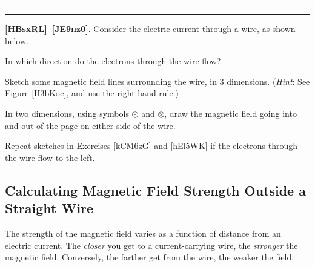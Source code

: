 \documentclass{article}
\begin{document}
\hrule\hrule 

\vspace{1em}

\textbf{\ref{HBsxRL}--\ref{JE9nz0}}. Consider the electric current through a wire, as shown below.

\begin{center}
\end{center}

\begin{exercise} \label{HBsxRL}
    In which direction do the electrons through the wire flow?
\end{exercise}

\begin{exercise} \label{kCM6zG}
    Sketch some magnetic field lines surrounding the wire, in 3 dimensions. (\textit{Hint}: See Figure \ref{H3bKoc}, and use the right-hand rule.)
\end{exercise}

\begin{exercise} \label{hEl5WK}
    In two dimensions, using symbols $\odot$ and $\otimes$, draw the magnetic field going into and out of the page on either side of the wire.
\end{exercise}

\begin{exercise} \label{JE9nz0}
    Repeat sketches in Exercises \ref{kCM6zG} and \ref{hEl5WK} if the electrons through the wire flow to the left. 
\end{exercise}

\clearpage

\subsection*{Calculating Magnetic Field Strength Outside a Straight Wire} \label{NErSiN}
The strength of the magnetic field varies as a function of distance from an electric current. The \textit{closer} you get to a current-carrying wire, the \textit{stronger} the magnetic field. Conversely, the farther get from the wire, the weaker the field. 

\begin{center}
\end{center}
\end{document}
